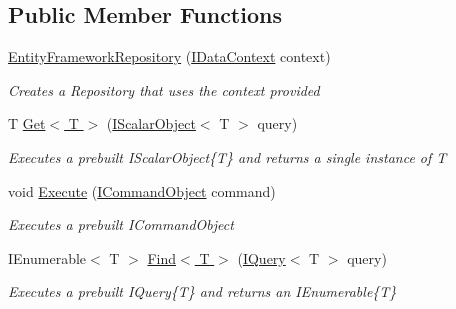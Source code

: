 \subsection*{Public Member Functions}
\begin{DoxyCompactItemize}
\item 
\hyperlink{class_highway_1_1_data_1_1_entity_framework_1_1_repositories_1_1_entity_framework_repository_a9f5b6355d4a5054c37bcd19a6a444aca}{Entity\-Framework\-Repository} (\hyperlink{interface_highway_1_1_data_1_1_interfaces_1_1_i_data_context}{I\-Data\-Context} context)
\begin{DoxyCompactList}\small\item\em Creates a Repository that uses the context provided \end{DoxyCompactList}\item 
T \hyperlink{class_highway_1_1_data_1_1_entity_framework_1_1_repositories_1_1_entity_framework_repository_a96b10f64c2c73cdc8c19ceed3f97004d}{Get$<$ T $>$} (\hyperlink{interface_highway_1_1_data_1_1_interfaces_1_1_i_scalar_object-g}{I\-Scalar\-Object}$<$ T $>$ query)
\begin{DoxyCompactList}\small\item\em Executes a prebuilt I\-Scalar\-Object\{\-T\} and returns a single instance of {\itshape T}  \end{DoxyCompactList}\item 
void \hyperlink{class_highway_1_1_data_1_1_entity_framework_1_1_repositories_1_1_entity_framework_repository_a2cf1765e57f0e5527e2c36888eaf38f9}{Execute} (\hyperlink{interface_highway_1_1_data_1_1_interfaces_1_1_i_command_object}{I\-Command\-Object} command)
\begin{DoxyCompactList}\small\item\em Executes a prebuilt I\-Command\-Object \end{DoxyCompactList}\item 
I\-Enumerable$<$ T $>$ \hyperlink{class_highway_1_1_data_1_1_entity_framework_1_1_repositories_1_1_entity_framework_repository_af361e5a4bc1f44f9165cc450add06ece}{Find$<$ T $>$} (\hyperlink{interface_highway_1_1_data_1_1_interfaces_1_1_i_query-g}{I\-Query}$<$ T $>$ query)
\begin{DoxyCompactList}\small\item\em Executes a prebuilt I\-Query\{\-T\} and returns an I\-Enumerable\{\-T\} \end{DoxyCompactList}\end{DoxyCompactItemize}

